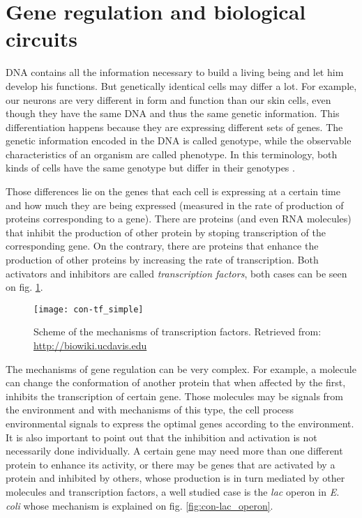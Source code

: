 \section{Gene regulation and biological circuits}

DNA contains all the information necessary to build a living being and let him develop his functions. But genetically identical cells may differ a lot. For example, our neurons are very different in form and function than our skin cells, even though they have the same DNA and thus the same genetic information. This differentiation happens because they are expressing different sets of genes. The genetic information encoded in the DNA is called genotype, while the observable characteristics of an organism are called phenotype. In this terminology, both kinds of cells have the same genotype but differ in their genotypes \cite{alberts13} \cite{alon06}.

Those differences lie on the genes that each cell is expressing at a certain time and how much they are being expressed (measured in the rate of production of proteins corresponding to a gene). There are proteins (and even RNA molecules) that inhibit the production of other protein by stoping transcription of the corresponding gene. On the contrary, there are proteins that enhance the production of other proteins by increasing the rate of transcription. Both activators and inhibitors are called \textit{transcription factors}, both cases can be seen on fig. \ref{fig:con-tf_simple}.

\begin{figure}[H]
  \centering
  \texttt{[image: con-tf\_simple]}
  \caption[Transcription factors]{\label{fig:con-tf_simple} Scheme of the mechanisms of transcription factors. Retrieved from: \url{http://biowiki.ucdavis.edu}}
\end{figure}

The mechanisms of gene regulation can be very complex. For example, a molecule can change the conformation of another protein that when affected by the first, inhibits the transcription of certain gene. Those molecules may be signals from the environment and with mechanisms of this type, the cell process environmental signals to express the optimal genes according to the environment. It is also important to point out that the inhibition and activation is not necessarily done individually. A certain gene may need more than one different protein to enhance its activity, or there may be genes that are activated by a protein and inhibited by others, whose production is in turn mediated by other molecules and transcription factors, a well studied case is the \textit{lac} operon in \textit{E. coli} whose mechanism is explained on fig. \ref{fig:con-lac_operon}.

